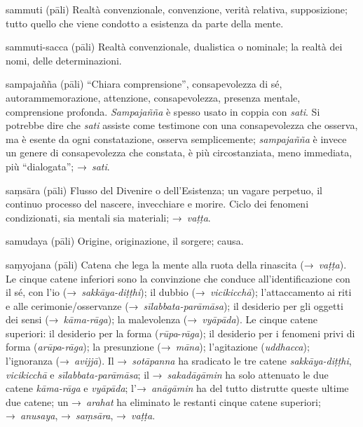 \begin{glossarydescription}
\item[sammuti] (pāli) Realtà convenzionale, convenzione, verità relativa,
  supposizione; tutto quello che viene condotto a esistenza da parte della
  mente.

\item[sammuti-sacca] (pāli) Realtà convenzionale, dualistica o nominale; la
  realtà dei nomi, delle determinazioni.

\item[sampajañña] (pāli) ``Chiara comprensione'', consapevolezza di sé,
  autorammemorazione, attenzione, consapevolezza, presenza mentale, comprensione
  profonda. \emph{Sampajañña} è spesso usato in coppia con \emph{sati}. Si
  potrebbe dire che \emph{sati} assiste come testimone con una consapevolezza
  che osserva, ma è esente da ogni constatazione, osserva semplicemente;
  \emph{sampajañña} è invece un genere di consapevolezza che constata, è più
  circostanziata, meno immediata, più ``dialogata''; →~\emph{sati}.

\item[saṃsāra] (pāli) Flusso del Divenire o dell'Esistenza; un vagare perpetuo,
  il continuo processo del nascere, invecchiare e morire. Ciclo dei fenomeni
  condizionati, sia mentali sia materiali; →~\emph{vaṭṭa}.

\item[samudaya] (pāli) Origine, originazione, il sorgere; causa.

\item[saṃyojana] (pāli)\label{glossary-samyojana} Catena che lega la mente alla ruota della rinascita
  (→~\emph{vaṭṭa}). Le cinque catene inferiori sono la convinzione che conduce
  all'identificazione con il sé, con l'io (→~\emph{sakkāya-diṭṭhi}); il dubbio
  (→~\emph{vicikicchā}); l'attaccamento ai riti e alle cerimonie/osservanze
  (→~\emph{sīlabbata-parāmāsa}); il desiderio per gli oggetti dei sensi
  (→~\emph{kāma-rāga}); la malevolenza (→~\emph{vyāpāda}). Le cinque catene
  superiori: il desiderio per la forma (\emph{rūpa}-\emph{rāga}); il desiderio
  per i fenomeni privi di forma (\emph{arūpa}-\emph{rāga}); la presunzione
  (→~\emph{māna}); l'agitazione (\emph{uddhacca}); l'ignoranza
  (→~\emph{avijjā}). Il →~\emph{sotāpanna} ha sradicato le tre catene
  \emph{sakkāya-diṭṭhi}, \emph{vicikicchā} e \emph{sīlabbata-parāmāsa}; il
  →~\emph{sakadāgāmin} ha solo attenuato le due catene \emph{kāma-rāga} e
  \emph{vyāpāda}; l'→~\emph{anāgāmin} ha del tutto distrutte queste ultime due
  catene; un →~\emph{arahat} ha eliminato le restanti cinque catene superiori;
  →~\emph{anusaya}, →~\emph{saṃsāra}, →~\emph{vaṭṭa}.


\end{glossarydescription}
